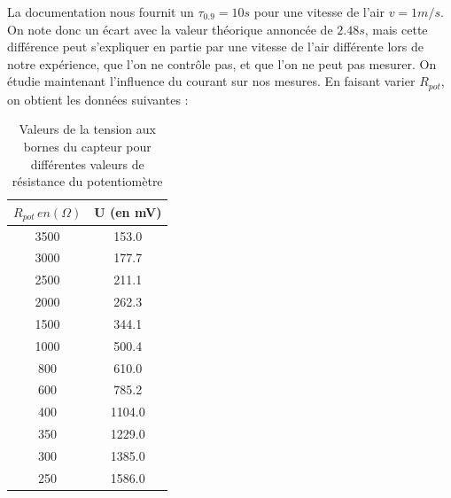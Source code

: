 \documentclass[12pt]{article}
\begin{document}
La documentation nous fournit un $\tau_{0.9} = 10s$ pour une vitesse de l'air $v = 1m/s$. On note donc un écart avec la valeur théorique annoncée de $2.48s$, mais cette différence peut s'expliquer en partie par 
une vitesse de l'air différente lors de notre expérience, que l'on ne contrôle pas, et que l'on ne peut pas mesurer. 
On étudie maintenant l'influence du courant sur nos mesures. En faisant varier $R_{pot}$, on obtient les données suivantes :
\begin{table}[h!]
	\begin{center}
		\begin{tabular}{|c|c|}
\hline
 $R_{pot}\, en (\Omega)$ &  U (en mV) \\
\hline
  3500 &      153.0 \\
  3000 &      177.7 \\
  2500 &      211.1 \\
  2000 &      262.3 \\
  1500 &      344.1 \\
  1000 &      500.4 \\
   800 &      610.0 \\
   600 &      785.2 \\
   400 &     1104.0 \\
   350 &     1229.0 \\
   300 &     1385.0 \\
   250 &     1586.0 \\
\hline
\end{tabular}
	\end{center}
	\label{Tableau_puissance}
	\caption{Valeurs de la tension aux bornes du capteur pour différentes valeurs de résistance du potentiomètre}
\end{table}
\end{document}
